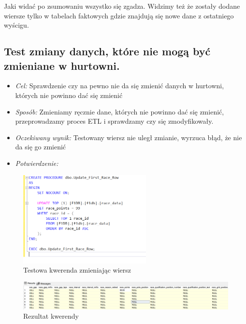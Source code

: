 \documentclass[12pt]{article}
\begin{document}
Jaki widać po zsumowaniu wszystko się zgadza. Widzimy też że zostały dodane wiersze tylko w tabelach faktowych gdzie znajdują się nowe dane z ostatniego wyścigu.


\subsection{Test zmiany danych, które nie mogą być zmieniane w hurtowni.}
\begin{itemize}
    \item \textit{Cel:} Sprawdzenie czy na pewno nie da się zmienić danych w hurtowni, których nie powinno dać się zmienić
    \item \textit{Sposób:}
   Zmieniamy ręcznie dane, których nie powinno dać się zmienić, przeprowadzamy proces ETL i sprawdzamy czy się zmodyfikowały.
     \item \textit{Oczekiwany wynik:}
     Testowany wiersz nie uległ zmianie, wyrzuca błąd, że nie da się go zmienić
      \item \textit{Potwierdzenie:}
\end{itemize}

\begin{figure}[H]
    \centering   \includegraphics[width=0.6\textwidth]{test16.png}
    \caption{Testowa kwerenda zmieniając wiersz}
\end{figure}

\begin{figure}[H]
    \centering   \includegraphics[width=\textwidth]{test15.png}
    \caption{Rezultat kwerendy}
\end{figure}
\end{document}

